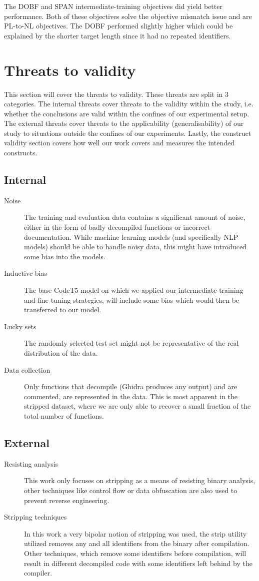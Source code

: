 The DOBF and SPAN intermediate-training objectives did yield better performance. Both of these objectives solve the objective mismatch issue and are PL-to-NL objectives. The DOBF performed slightly higher which could be explained by the shorter target length since it had no repeated identifiers.

\section{Threats to validity}

This section will cover the threats to validity. These threats are split in 3 categories. The internal threats cover threats to the validity within the study, i.e. whether the conclusions are valid within the confines of our experimental setup. The external threats cover threats to the applicability (generalisability) of our study to situations outside the confines of our experiments. Lastly, the construct validity section covers how well our work covers and measures the intended constructs.
\subsection{Internal}
    \begin{description}
        \item[Noise] The training and evaluation data contains a significant amount of noise, either in the form of badly decompiled functions or incorrect documentation. While machine learning models (and specifically NLP models) should be able to handle noisy data, this might have introduced some bias into the models.
        \item[Inductive bias] The base CodeT5 model on which we applied our intermediate-training and fine-tuning strategies, will include some bias which would then be transferred to our model.
        \item[Lucky sets] The randomly selected test set might not be representative of the real distribution of the data.
        \item[Data collection] Only functions that decompile (Ghidra produces any output) and are commented, are represented in the data. This is most apparent in the stripped dataset, where we are only able to recover a small fraction of the total number of functions. 
    \end{description}
\subsection{External}
    \begin{description}
        \item[Resisting analysis] This work only focuses on stripping as a means of resisting binary analysis, other techniques like control flow or data obfuscation are also used to prevent reverse engineering. 
        \item[Stripping techniques] In this work a very bipolar notion of stripping was used, the strip utility utilized removes any and all identifiers from the binary after compilation. Other techniques, which remove some identifiers before compilation, will result in different decompiled code with some identifiers left behind by the compiler. 
    \end{description}

